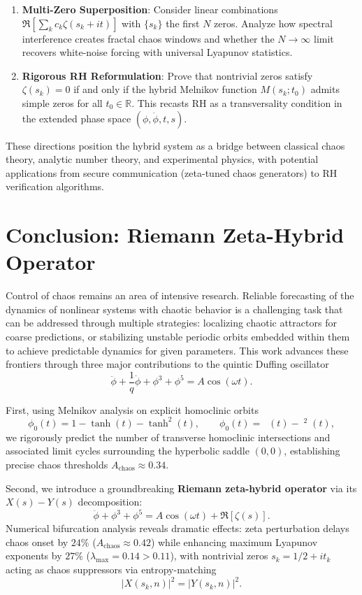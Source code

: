 \documentclass{ws-ijbc}
\DeclareMathOperator{\RZsech}{sech_{RZ}}
\begin{document}
\begin{enumerate}
\item \textbf{Multi-Zero Superposition}: Consider linear combinations $\Re[\sum_kc_k\zeta(s_k+it)]$ with $\{s_k\}$ the first $N$ zeros. Analyze how spectral interference creates fractal chaos windows and whether the $N\to\infty$ limit recovers white-noise forcing with universal Lyapunov statistics.

\item \textbf{Rigorous RH Reformulation}: Prove that nontrivial zeros satisfy $\zeta(s_k)=0$ if and only if the hybrid Melnikov function $M(s_k;t_0)$ admits simple zeros for all $t_0\in\mathbb{R}$. This recasts RH as a transversality condition in the extended phase space $(\phi,\dot{\phi},t,s)$.
\end{enumerate}

These directions position the hybrid system as a bridge between classical chaos theory, analytic number theory, and experimental physics, with potential applications from secure communication (zeta-tuned chaos generators) to RH verification algorithms.






\section{Conclusion: Riemann Zeta-Hybrid Operator}

Control of chaos remains an area of intensive research. Reliable forecasting of the dynamics of nonlinear systems with chaotic behavior \cite{EKF_DrLeung3} is a challenging task that can be addressed through multiple strategies: localizing chaotic attractors for coarse predictions, or stabilizing unstable periodic orbits embedded within them to achieve predictable dynamics for given parameters. This work advances these frontiers through three major contributions to the quintic Duffing oscillator
\[
\ddot{\phi}+\frac{1}{q}\dot{\phi}+\phi^3+\phi^5=A\cos(\omega t).
\]

First, using Melnikov analysis on explicit homoclinic orbits
\[
\phi_0(t)=1-\tanh(t)-\tanh^2(t),\qquad 
\phi_0(t)=\RZsech(t)-\RZsech^2(t),
\]
we rigorously predict the number of transverse homoclinic intersections and associated limit cycles surrounding the hyperbolic saddle $(0,0)$, establishing precise chaos thresholds $A_\mathrm{chaos}\approx0.34$.

Second, we introduce a groundbreaking \textbf{Riemann zeta-hybrid operator} via its $X(s)-Y(s)$ decomposition:
\[
\ddot{\phi}+\phi^3+\phi^5=A\cos(\omega t)+\Re[\zeta(s)].
\]
Numerical bifurcation analysis reveals dramatic effects: zeta perturbation delays chaos onset by $24\%$ ($A_\mathrm{chaos}\approx0.42$) while enhancing maximum Lyapunov exponents by $27\%$ ($\lambda_\mathrm{max}=0.14>0.11$), with nontrivial zeros $s_k=1/2+it_k$ acting as chaos suppressors via entropy-matching
\[
|X(s_k,n)|^2=|Y(s_k,n)|^2.
\]
\end{document}
